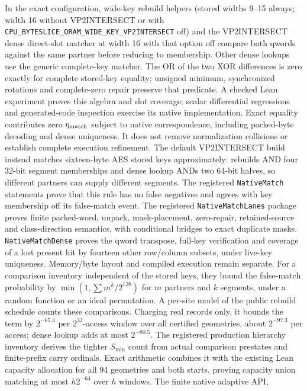 \documentclass[11pt]{article}
\theoremstyle{definition}
\theoremstyle{remark}
\begin{document}
In the exact configuration, wide-key rebuild helpers (stored widths 9--15
always; width 16 without VP2INTERSECT or with
\texttt{CPU\_BYTESLICE\_ORAM\_WIDE\_KEY\_VP2INTERSECT} off) and the
VP2INTERSECT dense direct-slot matcher at width 16 with that option off compare both
qwords against the same partner before reducing to membership. Other dense
lookups use the generic complete-key matcher. The OR of the
two XOR differences is zero exactly for complete stored-key equality;
unsigned minimum, synchronized rotations and complete-zero repair preserve
that predicate. A checked Lean experiment proves this algebra and slot
coverage; scalar differential regressions and generated-code inspection
exercise its native implementation. Exact equality contributes zero $\eta_{\rm match}$ subject to
native correspondence, including packed-byte decoding and dense uniqueness.
It does not remove normalization collisions or establish complete execution
refinement. The default VP2INTERSECT build instead matches sixteen-byte AES
stored keys approximately: rebuilds AND four 32-bit segment memberships and
dense lookup ANDs two 64-bit halves, so different partners can supply
different segments. The registered \texttt{NativeMatch} statements prove that
this rule has no false negatives and agrees with key membership off its
false-match event. The registered \texttt{NativeMatchLanes} package proves
finite packed-word, unpack, mask-placement, zero-repair, retained-source and
class-direction semantics, with conditional bridges to exact duplicate masks.
\texttt{NativeMatchDense} proves the qword transpose, full-key verification
and coverage of a lost present hit by fourteen other row/column subsets,
under live-key uniqueness. Memory/byte layout and compiled execution remain
separate. For a comparison inventory independent of the stored keys,
they bound the false-match probability by $\min(1, \sum m^k / 2^{128})$ for
$m$ partners and $k$ segments, under a random function or an ideal
permutation. A per-site model of the public rebuild schedule counts these
comparisons. Charging real records only, it bounds the
term by $2^{-65.3}$ per $2^{32}$-access window over all certified geometries,
about $2^{-97.3}$ per access; dense lookup adds at most $2^{-80.5}$. The registered production hierarchy inventory derives the tighter
$S_{\min}$ count from actual comparison prestates and finite-prefix carry
ordinals. Exact arithmetic combines it with the existing Lean capacity
allocation for all 94 geometries and both starts, proving capacity union
matching at most $h2^{-64}$ over $h$ windows. The finite native adaptive API,
\end{document}
